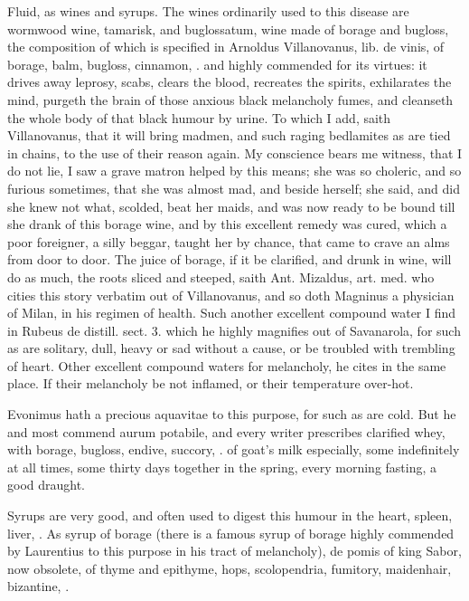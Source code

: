 {Fluid, as wines and syrups. The wines ordinarily used to this disease
are wormwood wine, tamarisk, and buglossatum, wine made of borage and
bugloss, the composition of which is specified in Arnoldus
Villanovanus, lib. de vinis, of borage, balm, bugloss, cinnamon, \etc{}.
and highly commended for its virtues: it drives away leprosy,
scabs, clears the blood, recreates the spirits, exhilarates the mind,
purgeth the brain of those anxious black melancholy fumes, and
cleanseth the whole body of that black humour by urine. To which I add,
saith Villanovanus, that it will bring madmen, and such raging
bedlamites as are tied in chains, to the use of their reason again. My
conscience bears me witness, that I do not lie, I saw a grave matron
helped by this means; she was so choleric, and so furious sometimes,
that she was almost mad, and beside herself; she said, and did she knew
not what, scolded, beat her maids, and was now ready to be bound till
she drank of this borage wine, and by this excellent remedy was cured,
which a poor foreigner, a silly beggar, taught her by chance, that came
to crave an alms from door to door. The juice of borage, if it be
clarified, and drunk in wine, will do as much, the roots sliced and
steeped, \etc{} saith Ant. Mizaldus, art. med. who cities this story
verbatim out of Villanovanus, and so doth Magninus a physician of
Milan, in his regimen of health. Such another excellent compound water
I find in Rubeus de distill. sect. 3. which he highly magnifies out of
Savanarola, for such as are solitary, dull, heavy or sad without
a cause, or be troubled with trembling of heart. Other excellent
compound waters for melancholy, he cites in the same place. If
their melancholy be not inflamed, or their temperature over-hot.

Evonimus hath a precious aquavitae to this purpose, for such as are
cold. But he and most commend aurum potabile, and every writer
prescribes clarified whey, with borage, bugloss, endive, succory, \etc{}.
of goat's milk especially, some indefinitely at all times, some thirty
days together in the spring, every morning fasting, a good draught.

Syrups are very good, and often used to digest this humour in the
heart, spleen, liver, \etc{}. As syrup of borage (there is a famous syrup
of borage highly commended by Laurentius to this purpose in his tract
of melancholy), de pomis of king Sabor, now obsolete, of thyme and
epithyme, hops, scolopendria, fumitory, maidenhair, bizantine, \etc{}.

}
